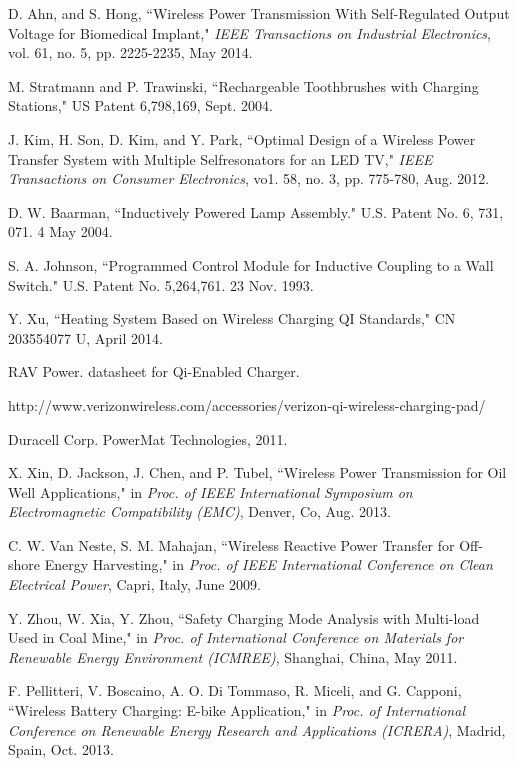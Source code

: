 \documentclass[twocolumn,10pt]{IEEEtran}
\begin{document}
\begin{thebibliography}{99}
  D. Ahn, and S. Hong, ``Wireless Power Transmission With Self-Regulated Output Voltage for Biomedical Implant," 
\emph{IEEE Transactions on Industrial Electronics}, 
vol. 61, no. 5, pp. 2225-2235, May 2014.

 M. Stratmann and P. Trawinski, ``Rechargeable Toothbrushes with Charging Stations," US Patent 6,798,169, Sept. 2004. 

 J. Kim, H. Son, D. Kim, and Y. Park, ``Optimal Design of a Wireless Power Transfer System with Multiple Selfresonators
for an LED TV," \emph{IEEE Transactions on Consumer
Electronics}, vo1. 58, no. 3, pp. 775-780, Aug. 2012.

 D. W. Baarman, ``Inductively Powered Lamp Assembly." U.S. Patent No. 6, 731, 071. 4 May 2004.

 S. A. Johnson, ``Programmed Control Module for Inductive Coupling to a Wall Switch." U.S. Patent No. 5,264,761. 23 Nov. 1993.

 Y. Xu, ``Heating System Based on Wireless Charging QI Standards," CN 203554077 U, April 2014.

RAV Power. datasheet for Qi-Enabled Charger.

http://www.verizonwireless.com/accessories/verizon-qi-wireless-charging-pad/

Duracell Corp. PowerMat Technologies, 2011.

X. Xin, D. Jackson, J. Chen, and P. Tubel, ``Wireless Power Transmission for Oil Well Applications," in \emph{Proc. of IEEE International Symposium on Electromagnetic Compatibility (EMC)}, Denver, Co, Aug. 2013.

  C. W. Van Neste, S. M. Mahajan, ``Wireless Reactive Power Transfer for Off-shore Energy Harvesting," in \emph{Proc. of IEEE International Conference on Clean Electrical Power}, Capri, Italy, June 2009.

 Y. Zhou, W. Xia, Y. Zhou, ``Safety Charging Mode
Analysis with Multi-load Used in Coal Mine," in \emph{Proc. of International Conference on Materials for Renewable Energy  Environment (ICMREE)}, Shanghai, China, May 2011.

F. Pellitteri, V. Boscaino, A. O. Di Tommaso, R. Miceli, and G.
Capponi, ``Wireless Battery Charging: E-bike Application," in \emph{Proc. of International Conference on Renewable Energy Research and Applications (ICRERA)}, Madrid, Spain, Oct. 2013.


\end{thebibliography}
\end{document}
